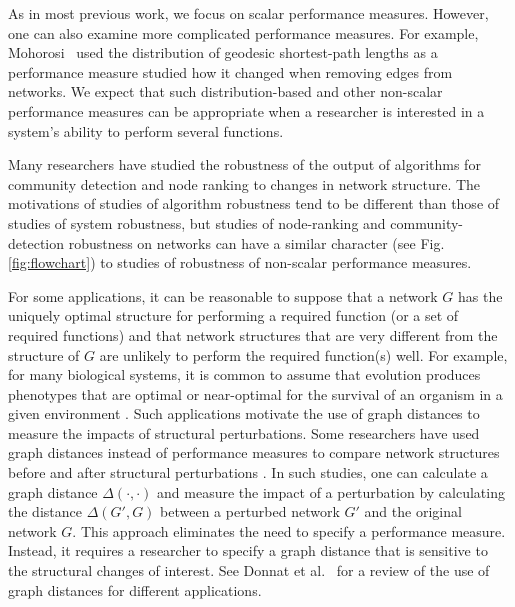 \documentclass{comnet-mod}
\begin{document}
As in most previous work, we focus on scalar performance measures. However, one can also examine more complicated performance measures. For example, Mohorosi~\cite{Morohosi2010} used the distribution of geodesic shortest-path lengths as a performance measure studied how it changed when removing edges from networks. We expect that such distribution-based and other non-scalar performance measures can be appropriate when a researcher is interested in a system's ability to perform several functions. 

Many researchers have studied the robustness of the output of algorithms for community detection \cite{Karrer2008, Subelj2011, Li2015, Shizuka2016} and node ranking \cite{Costenbader2003, Borgatti2006, Frantz2009, Niu2015, Segarra2015} to changes in network structure. The motivations of studies of algorithm robustness tend to be different than those of studies of system robustness, but studies of node-ranking and community-detection robustness on networks can have a similar character (see Fig.\,\ref{fig:flowchart}) to studies of robustness of non-scalar performance measures.

For some applications, it can be reasonable to suppose that a network $G$ has the uniquely optimal structure for performing a required function (or a set of required functions) and that network structures that are very different from the structure of $G$ are unlikely to perform the required function(s) well. For example, for many biological systems, it is common to assume that evolution produces phenotypes that are optimal or near-optimal for the survival of an organism in a given environment \cite{Kitano2004}. Such applications motivate the use of graph distances to measure the impacts of structural perturbations. Some researchers have used graph distances instead of performance measures to compare network structures before and after structural perturbations \cite{Boldi2011, Schieber2016}. In such studies, one can calculate a graph distance $\Delta(\cdot,\cdot)$ and measure the impact of a perturbation by calculating the distance $\Delta(G',G)$ between a perturbed network $G'$ and the original network $G$. This approach eliminates the need to specify a performance measure. Instead, it requires a researcher to specify a graph distance that is sensitive to the structural changes of interest. See Donnat et al.~\cite{Donnat2018} for a review of the use of graph distances for different applications.
\end{document}
